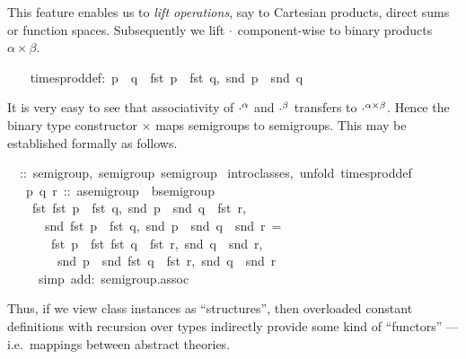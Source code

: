 \begin{isabelle}
\begin{isamarkuptext}
 This feature enables us to \emph{lift operations}, say to Cartesian
 products, direct sums or function spaces.  Subsequently we lift
 $\cdot$ component-wise to binary products $\alpha \times \beta$.%
\end{isamarkuptext}%
\ {\isacharparenleft}\isanewline
\ \ times{\isacharunderscore}prod{\isacharunderscore}def:\ {\isachardoublequote}p\ {\isasymOtimes}\ q\ {\isasymequiv}\ {\isacharparenleft}fst\ p\ {\isasymOtimes}\ fst\ q,\ snd\ p\ {\isasymOtimes}\ snd\ q{\isacharparenright}{\isachardoublequote}%
\begin{isamarkuptext}%
It is very easy to see that associativity of $\cdot^\alpha$ and
 $\cdot^\beta$ transfers to ${\cdot}^{\alpha \times \beta}$.  Hence
 the binary type constructor $\times$ maps semigroups to semigroups.
 This may be established formally as follows.%
\end{isamarkuptext}%
\ {\isacharasterisk}\ ::\ {\isacharparenleft}semigroup,\ semigroup{\isacharparenright}\ semigroup\isanewline
{}\ {\isacharparenleft}intro{\isacharunderscore}classes,\ unfold\ times{\isacharunderscore}prod{\isacharunderscore}def{\isacharparenright}\isanewline
\ \ \ p\ q\ r\ ::\ {\isachardoublequote}{\isacharprime}a{\isasymColon}semigroup\ {\isasymtimes}\ {\isacharprime}b{\isasymColon}semigroup{\isachardoublequote}\isanewline
\ \ \isanewline
\ \ \ \ {\isachardoublequote}{\isacharparenleft}fst\ {\isacharparenleft}fst\ p\ {\isasymOtimes}\ fst\ q,\ snd\ p\ {\isasymOtimes}\ snd\ q{\isacharparenright}\ {\isasymOtimes}\ fst\ r,\isanewline
\ \ \ \ \ \ snd\ {\isacharparenleft}fst\ p\ {\isasymOtimes}\ fst\ q,\ snd\ p\ {\isasymOtimes}\ snd\ q{\isacharparenright}\ {\isasymOtimes}\ snd\ r{\isacharparenright}\ =\isanewline
\ \ \ \ \ \ \ {\isacharparenleft}fst\ p\ {\isasymOtimes}\ fst\ {\isacharparenleft}fst\ q\ {\isasymOtimes}\ fst\ r,\ snd\ q\ {\isasymOtimes}\ snd\ r{\isacharparenright},\isanewline
\ \ \ \ \ \ \ \ snd\ p\ {\isasymOtimes}\ snd\ {\isacharparenleft}fst\ q\ {\isasymOtimes}\ fst\ r,\ snd\ q\ {\isasymOtimes}\ snd\ r{\isacharparenright}{\isacharparenright}{\isachardoublequote}\isanewline
\ \ \ \ \ {\isacharparenleft}simp\ add:\ semigroup.assoc{\isacharparenright}\isanewline
{}%
\begin{isamarkuptext}%
Thus, if we view class instances as ``structures'', then overloaded
 constant definitions with recursion over types indirectly provide
 some kind of ``functors'' --- i.e.\ mappings between abstract
 theories.%
\end{isamarkuptext}%
\end{isabelle}%
